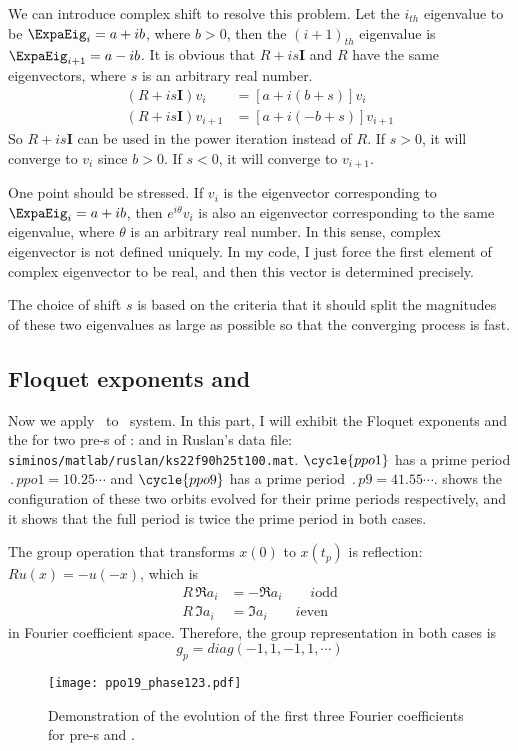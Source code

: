 			We can introduce complex shift to resolve this problem. Let the $i_{th}$ eigenvalue to be
			$\ExpaEig_{i}=a+ib$, where $b>0$, then the $(i+1)_{th}$ eigenvalue is $\ExpaEig_{i+1}=a-ib$. It is obvious
			that $R+is\mathbf{I}$ and $R$ have the same eigenvectors, where $s$ is an arbitrary real number.
			\begin{align*}	
			(R+is\mathbf{I})v_{i} & =[a+i(b+s)]v_{i}\\
			(R+is\mathbf{I})v_{i+1} & =[a+i(-b+s)]v_{i+1}
			\end{align*}	
			So $R+is\mathbf{I}$ can be used in the power iteration instead of $R$. If $s>0$, it will converge to $v_{i}$
			since $b>0$. If $s<0$, it will converge to $v_{i+1}$.

			One point should be stressed. If $v_{i}$ is the eigenvector corresponding to $\ExpaEig_{i}=a+ib$, then
			$e^{i\theta}v_{i}$ is also an eigenvector corresponding to the same eigenvalue, where $\theta$ is an
			arbitrary real number. In this sense, complex eigenvector is not defined uniquely. In my code, I just force
			the first element of complex eigenvector to be real, and then this vector is determined precisely.
			
			The choice of shift $s$ is based on the criteria that it should split the magnitudes of these two eigenvalues
			as large as possible so that the converging process is fast.

		



\subsection{Floquet exponents and {\cLvs}}

	Now we apply \psd\ to \KS\ system. In this part, I will exhibit the Floquet
	exponents and  the {\cLvs} for two pre-\po s of
	\KSe:  and  in Ruslan's data file:
\\
	\texttt{siminos/matlab/ruslan/ks22f90h25t100.mat}. $\cycle{ppo1}$ has a prime
	period $\period{ppo1}=10.25\cdots$ and $\cycle{ppo9}$ has a prime period $\period{p9}=41.55\cdots$.
	 shows the configuration of these two orbits evolved
	for their prime periods respectively, and it shows that the  full period is twice
	the prime period in both cases.

	The group operation that transforms $x(0)$ to
	$x(t_{p})$ is reflection: $Ru(x)=-u(-x)$, which is
	\begin{align*}	
	R \, \Re a_{i} & =-\Re a_{i} \qquad i \mbox{odd}\\
	R \, \Im a_{i} & =\Im a_{i}  \qquad i \mbox{even}
	\end{align*}
	in Fourier coefficient space. Therefore, the group representation in both cases is
	\[
	g_{p}=diag(-1,1,-1,1,\cdots)
	\]
	\begin{figure}%
	\centering
		\texttt{[image: ppo19\_phase123.pdf]}
		\caption{Demonstration of the evolution of the first
		three Fourier coefficients for pre-\po s  and .
		}
		\label{fig:ppo19_phase123}
	\end{figure}
	
